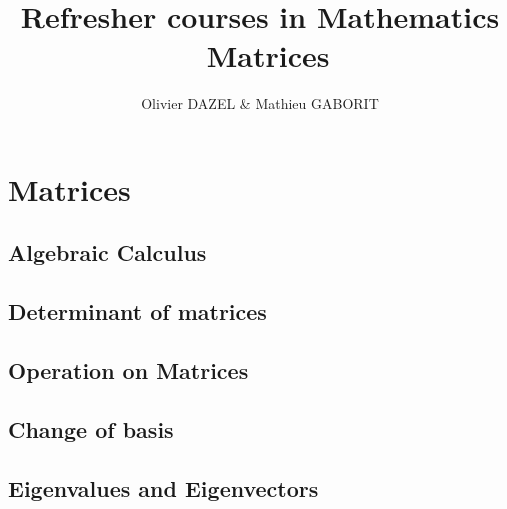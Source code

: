 \documentclass[10pt,a4paper]{report}
\title{\Large \textbf{Refresher courses in Mathematics}\\\
Matrices
}
\author{Olivier DAZEL \& Mathieu GABORIT}
\begin{document}
\maketitle




\chapter{Matrices}


\section{Algebraic Calculus}








%


\section{Determinant of matrices}









%


\section{Operation on Matrices}


\section{Change of basis}





\section{Eigenvalues and Eigenvectors}
\end{document}
